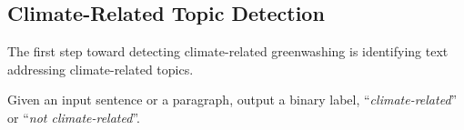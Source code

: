  


\subsection{Climate-Related Topic Detection}
\label{sec:climate-related topic}

The first step toward detecting climate-related greenwashing is identifying text addressing climate-related topics.


\task Given an input sentence or a paragraph, output a binary label,  ``\textit{climate-related}'' or ``\textit{not climate-related}''.

% 

